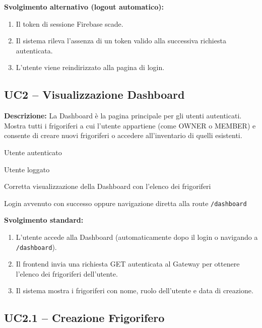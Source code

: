 \documentclass[12pt,a4paper,twoside]{report}
\newenvironment{ucbox}{%
  \begin{mdframed}[
    backgroundcolor=ucbg,
    linecolor=ucborder,
    linewidth=1pt,
    innerleftmargin=10pt,
    innerrightmargin=10pt,
    innertopmargin=8pt,
    innerbottommargin=8pt,
    roundcorner=4pt
  ]
}{%
  \end{mdframed}
}
\begin{document}
\textbf{Svolgimento alternativo (logout automatico):}
\begin{enumerate}
  \item Il token di sessione Firebase scade.
  \item Il sistema rileva l'assenza di un token valido alla successiva richiesta autenticata.
  \item L'utente viene reindirizzato alla pagina di login.
\end{enumerate}

\newpage
\subsection{UC2 -- Visualizzazione Dashboard}

\begin{ucbox}
\textbf{Descrizione:} La Dashboard è la pagina principale per gli utenti autenticati. Mostra tutti i frigoriferi a cui l'utente appartiene (come OWNER o MEMBER) e consente di creare nuovi frigoriferi o accedere all'inventario di quelli esistenti.

\begin{description}[leftmargin=4cm, style=sameline]
  \item[Attori Coinvolti:] Utente autenticato
  \item[Precondizione:] Utente loggato
  \item[Postcondizione:] Corretta visualizzazione della Dashboard con l'elenco dei frigoriferi
  \item[Trigger:] Login avvenuto con successo oppure navigazione diretta alla route \texttt{/dashboard}
\end{description}
\end{ucbox}

\textbf{Svolgimento standard:}
\begin{enumerate}
  \item L'utente accede alla Dashboard (automaticamente dopo il login o navigando a \texttt{/dashboard}).
  \item Il frontend invia una richiesta GET autenticata al Gateway per ottenere l'elenco dei frigoriferi dell'utente.
  \item Il sistema mostra i frigoriferi con nome, ruolo dell'utente e data di creazione.
\end{enumerate}

\newpage
\subsection{UC2.1 -- Creazione Frigorifero}
\end{document}

